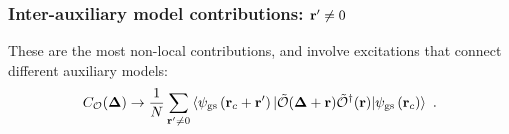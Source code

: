 \documentclass[reprint,hidelinks,onecolumn]{revtex4-2}
\begin{document}
\subsubsection{Inter-auxiliary model contributions: \({\bf r}^\prime \neq 0\)}
These are the most non-local contributions, and involve excitations that connect different auxiliary models:
\begin{equation}\begin{aligned}
	C_{\mathcal{O}}({\bf \Delta}) \to \frac{1}{N}\sum_{{\bf r}^\prime \neq 0}\braket{\psi_\text{gs}\left({\bf r}_c + {\bf r}^\prime\right) | \mathcal{\tilde O}({\bf \Delta} + {\bf r})\mathcal{\tilde O}^\dagger({\bf r}) | \psi_\text{gs}\left({\bf r}_c\right)}~.
\end{aligned}\end{equation}
\end{document}
